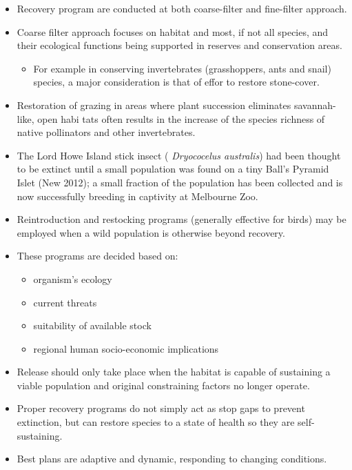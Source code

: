 \documentclass[
  ignorenonframetext,
  aspectratio=169]{beamer}
\providecommand{\tightlist}{%
  \setlength{\itemsep}{0pt}\setlength{\parskip}{0pt}}
\begin{document}
\begin{frame}{}
\protect\hypertarget{section-6}{}
\begin{itemize}
\tightlist
\item
  Recovery program are conducted at both coarse-filter and fine-filter
  approach.
\item
  Coarse filter approach focuses on habitat and most, if not all
  species, and their ecological functions being supported in reserves
  and conservation areas.

  \begin{itemize}
  \tightlist
  \item
    For example in conserving invertebrates (grasshoppers, ants and
    snail) species, a major consideration is that of effor to restore
    stone-cover.
  \end{itemize}
\item
  Restoration of grazing in areas where plant succession eliminates
  savannah-like, open habi tats often results in the increase of the
  species richness of native pollinators and other invertebrates.
\item
  The Lord Howe Island stick insect ( \emph{Dryococelus australis}) had
  been thought to be extinct until a small population was found on a
  tiny Ball's Pyramid Islet (New 2012); a small fraction of the
  population has been collected and is now successfully breeding in
  captivity at Melbourne Zoo.
\end{itemize}
\end{frame}

\begin{frame}{}
\protect\hypertarget{section-7}{}
\footnotesize

\begin{itemize}
\tightlist
\item
  Reintroduction and restocking programs (generally effective for birds)
  may be employed when a wild population is otherwise beyond recovery.
\item
  These programs are decided based on:

  \begin{itemize}
  \tightlist
  \item
    organism's ecology
  \item
    current threats
  \item
    suitability of available stock
  \item
    regional human socio-economic implications
  \end{itemize}
\item
  Release should only take place when the habitat is capable of
  sustaining a viable population and original constraining factors no
  longer operate.
\item
  Proper recovery programs do not simply act as stop gaps to prevent
  extinction, but can restore species to a state of health so they are
  self-sustaining.
\item
  Best plans are adaptive and dynamic, responding to changing
  conditions.
\end{itemize}
\end{frame}
\end{document}
